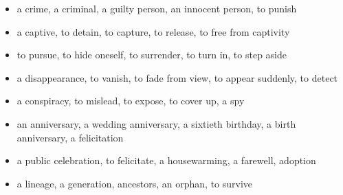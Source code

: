 \begin{itemize}
\raggedright
  \item a crime, a criminal, a guilty person, an innocent person, to punish
  \item a captive, to detain, to capture, to release, to free from captivity
  \item to pursue, to hide oneself, to surrender, to turn in, to step aside
  \item a disappearance, to vanish, to fade from view, to appear suddenly, to detect
  \item a conspiracy, to mislead, to expose, to cover up, a spy
  \item an anniversary, a wedding anniversary, a sixtieth birthday, a birth anniversary, a felicitation
  \item a public celebration, to felicitate, a housewarming, a farewell, adoption
  \item a lineage, a generation, ancestors, an orphan, to survive
\end{itemize}

